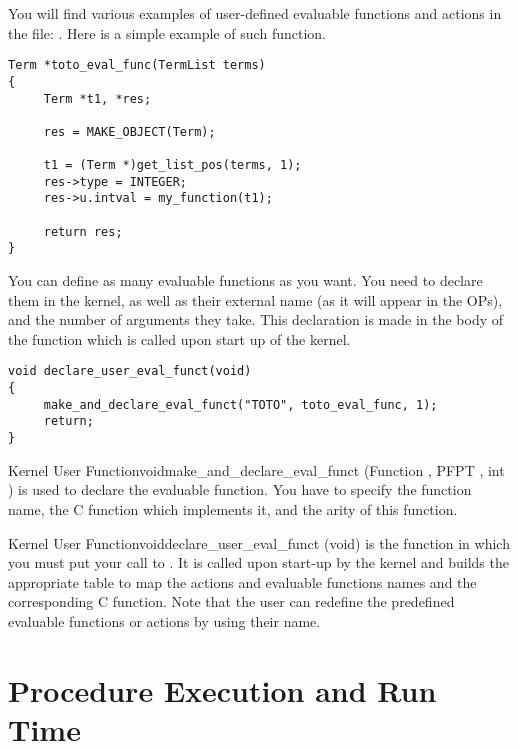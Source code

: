 You will find various examples of user-defined evaluable functions and
actions in the file: . Here is a simple example of
such function.

\begin{verbatim}
Term *toto_eval_func(TermList terms)
{
     Term *t1, *res;

     res = MAKE_OBJECT(Term);

     t1 = (Term *)get_list_pos(terms, 1);
     res->type = INTEGER;
     res->u.intval = my_function(t1);

     return res;
}
\end{verbatim}

You can define as many evaluable functions as you want.  You need to
declare them in the kernel, as well as their external name (as it will
appear in the OPs), and the number of arguments they take. This
declaration is made in the body of the 
function which is called upon start up of the kernel.

\begin{verbatim}
void declare_user_eval_funct(void)
{
     make_and_declare_eval_funct("TOTO", toto_eval_func, 1);
     return;
}
\end{verbatim}

\begin{typefn}{Kernel User Function}{void}{make\_and\_declare\_eval\_funct}
{(Function , PFPT , int )}
is used to declare the evaluable function. You have to specify the function
name, the C function which implements it, and the arity of this function.
\end{typefn}

\begin{typefn}{Kernel User Function}{void}{declare\_user\_eval\_funct} {(void)}
is the function in which you must put your call to
. It is called upon start-up by the
kernel and builds the appropriate table to map the actions and evaluable
functions names and the corresponding C function.  Note that the user can
redefine the predefined evaluable functions or actions by using their
name.
\end{typefn}

\chapter{Procedure Execution and Run Time}



